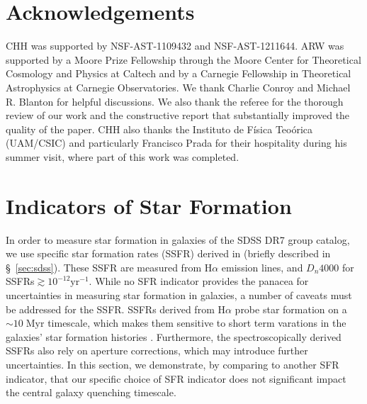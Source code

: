 \documentclass[iop,apj,tighten,twocolappendix,numberedappendix]{emulateapj}
\begin{document}

\section*{Acknowledgements}
CHH was supported by NSF-AST-1109432 and NSF-AST-1211644. 
ARW was supported by a Moore Prize Fellowship through the 
Moore Center for Theoretical Cosmology and Physics at Caltech 
and by a Carnegie Fellowship in Theoretical Astrophysics at 
Carnegie Observatories. We thank Charlie Conroy and Michael R. Blanton for 
helpful discussions. We also thank the referee for the thorough
review of our work and the constructive report that substantially 
improved the quality of the paper. CHH also thanks the Instituto  
de F\'{i}sica Teo\'{o}rica (UAM/CSIC) and particularly Francisco 
Prada for their hospitality during his summer visit, where part 
of this work was completed.

\appendix
\section{Indicators of Star Formation} \label{app:sfr}
In order to measure star formation in galaxies of the SDSS DR7 
group catalog, we use specific star formation rates (SSFR) derived
in \cite{Brinchmann:2004aa} (briefly described in \S~\ref{sec:sdss}). 
These SSFR are measured from H$\alpha$ emission lines, and 
$D_n4000$ for SSFRs$\gtrsim 10^{-12}\mathrm{yr}^{-1}$. While no 
SFR indicator provides the panacea for uncertainties in measuring
star formation in galaxies, a number of caveats must be addressed 
for the \cite{Brinchmann:2004aa} SSFR. SSFRs derived from H$\alpha$ 
probe star formation on a $\sim 10\;\mathrm{Myr}$ timescale, which 
makes them sensitive to short term varations in the galaxies' star 
formation histories \citep{Kennicutt:2012aa}. Furthermore, the 
spectroscopically derived \cite{Brinchmann:2004aa} SSFRs also 
rely on aperture corrections, which may introduce further 
uncertainties. In this section, we demonstrate, by comparing to 
another SFR indicator, that our specific choice of SFR indicator 
does not significant impact the central galaxy quenching 
timescale. 
\end{document}
